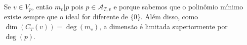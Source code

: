 \documentclass[../main.tex]{subfiles}
\begin{document}
Se $v\in V_{p}$, então $m_{v}|p$ pois $p\in\mathcal{A}_{T,v}$ e porque sabemos que o polinômio mínimo existe sempre que o ideal for diferente de $\{0\}$. Além disso, como $\dim(C_{T}(v))=\deg(m_{v})$, a dimensão é limitada superiormente por $\deg(p)$.
\end{document}
